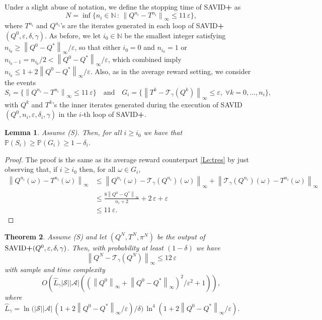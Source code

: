 \documentclass{article}
\newcommand{\cA}{\mathcal{A}}
\newcommand{\cS}{\mathcal{S}}
\newcommand{\prob}{\mathbb{P}}
\newcommand{\T}{\mathcal{T}}
\newcommand{\NN}{\mathbb{N}}
\newcommand*{\infn}[1]{\left\|{#1}\right\|_{\infty}}
\newcommand{\st}{N}
\theoremstyle{plain}
\newtheorem{theorem}{Theorem}[section]
\newtheorem{lemma}[theorem]{Lemma}
\theoremstyle{definition}
\theoremstyle{remark}
\begin{document}
Under a slight abuse of notation, we define the stopping time of \mbox{\rm SAVID\textbf{+}} as
$$
 \st =\inf \{ { n_i \in \mathbb N \,:\, \infn{Q^{n_i}-T^{n_i}} \le 11\,\varepsilon}\},
$$
where $T^{n_i}$ and $Q^{n_i}$'s are the iterates generated in each loop of \mbox{\rm SAVID\textbf{+}}$(Q^0,\varepsilon,\delta, \gamma)$. As before, we let $i_0 \in \NN$ be the smallest integer satisfying $n_{i_0}\ge\infn{Q^0-Q^{*}}/\varepsilon$, so that 
either $i_0=0$ and $n_{i_0}=1$ or $n_{i_0-1}=n_{i_0}/2<\infn{Q^0-Q^{*}}/\varepsilon$, which combined imply $n_{i_0}\le 1+2\infn{Q^0-Q^{*}}/\varepsilon$. Also, as in the average reward setting, we consider the events
    \begin{equation*}
S_{i}=\{\infn{Q^{n_i}-T^{n_i}} \le 11\,\varepsilon\} \quad \text{and} \quad G_i=\{ \infn{T^k-\T_\gamma (Q^k)} \le \varepsilon,\;\forall k=0,\ldots,n_i\},
\end{equation*}
with $Q^{k}$ and $T^{k}$'s the inner iterates generated during the execution of \mbox{\rm SAVID}$(Q^0,n_i,\varepsilon,\delta_i, \gamma)$ in the $i$-th loop of  \mbox{\rm SAVID\textbf{+}}. 
    \begin{lemma}\label{Le:tres-d}
       Assume \mbox{\sc (S)}. Then, for all $i \ge i_0$ we have that $\prob (S_{i}) \ge  \prob (G_{i}) \ge 1-\delta_{i}$.
    \end{lemma}
    \begin{proof} The proof is the same as its average reward counterpart \cref{Le:tres} by just observing that, if $i \ge i_0$ then, for all $\omega \in G_i$,
$$
\begin{aligned}
\infn{Q^{n_i}(\omega)-T^{n_i}(\omega)} &\le  \infn{Q^{n_i}(\omega)-\T_\gamma(Q^{n_i})(\omega)}+\infn{\T_\gamma(Q^{n_i})(\omega)-T^{n_i}(\omega)}\\
&\le \mbox{$\frac{8\infn{Q^0-Q^*}}{n_i+2}+2\,\varepsilon+\varepsilon$} \\
&\le 11\,\varepsilon.
\end{aligned}
$$

\vspace{-5ex}
    \end{proof}

\begin{theorem}{\label{thm:err-D-d}}
Assume \mbox{\sc (S)} and let $(Q^{N},T^{N},\pi^{N})$ be the output of $\mbox{\sc \mbox{\rm SAVID\textbf{+}}}(Q^0,\varepsilon,\delta, \gamma)$. Then, with probability at least $(1-\delta)$ we have 
\vspace{-1ex}
$$  \infn{Q^N-\T_\gamma(Q^N)}\leq 12\,\varepsilon$$
 with sample and time complexity $${O}\left(\widehat{L}_{\gamma}|\cS||\cA|\left(
 (\infn{Q^0}+\infn{Q^0-Q^*})^2/\varepsilon^{2}+1\right)\right),$$ where $\widehat{L}_{\gamma}=\ln\!\big(|\cS||\cA|\,(1\!+\!2\infn{Q^0-Q^*}/\varepsilon)/\delta \big)\,\ln^4(1\!+\!2\infn{Q^0-Q^*}/\varepsilon).$ 
\end{theorem}
\end{document}
